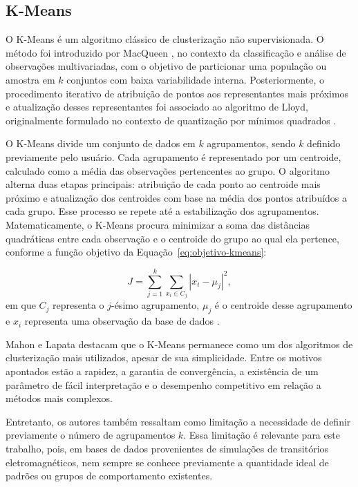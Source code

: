 \documentclass[
	12pt,				%
	openright,			%
	oneside,			%
	a4paper,			%
	chapter=TITLE,		%
	section=TITLE,		%
	subsection=TITLE,	%
	subsubsection=TITLE,%
	english,			%
	brazilian			%
	]{abntex2}
\theoremstyle{definition}
\begin{document}
\subsection{K-Means}

O K-Means é um algoritmo clássico de clusterização não supervisionada. O método foi introduzido por MacQueen \cite{macqueen1967}, no contexto da classificação e análise de observações multivariadas, com o objetivo de particionar uma população ou amostra em $k$ conjuntos com baixa variabilidade interna. Posteriormente, o procedimento iterativo de atribuição de pontos aos representantes mais próximos e atualização desses representantes foi associado ao algoritmo de Lloyd, originalmente formulado no contexto de quantização por mínimos quadrados \cite{lloyd1982}.

O K-Means divide um conjunto de dados em $k$ agrupamentos, sendo $k$ definido previamente pelo usuário. Cada agrupamento é representado por um centroide, calculado como a média das observações pertencentes ao grupo. O algoritmo alterna duas etapas principais: atribuição de cada ponto ao centroide mais próximo e atualização dos centroides com base na média dos pontos atribuídos a cada grupo. Esse processo se repete até a estabilização dos agrupamentos. Matematicamente, o K-Means procura minimizar a soma das distâncias quadráticas entre cada observação e o centroide do grupo ao qual ela pertence, conforme a função objetivo da Equação~\ref{eq:objetivo-kmeans}:

\begin{equation}
\label{eq:objetivo-kmeans}
J = \sum_{j=1}^{k} \sum_{x_i \in C_j} |x_i - \mu_j|^2,
\end{equation}
em que $C_j$ representa o $j$-ésimo agrupamento, $\mu_j$ é o centroide desse agrupamento e $x_i$ representa uma observação da base de dados \cite{bishop2006}.

Mahon e Lapata \cite{mahon2025} destacam que o K-Means permanece como um dos algoritmos de clusterização mais utilizados, apesar de sua simplicidade. Entre os motivos apontados estão a rapidez, a garantia de convergência, a existência de um parâmetro de fácil interpretação e o desempenho competitivo em relação a métodos mais complexos.

Entretanto, os autores também ressaltam como limitação a necessidade de definir previamente o número de agrupamentos $k$. Essa limitação é relevante para este trabalho, pois, em bases de dados provenientes de simulações de transitórios eletromagnéticos, nem sempre se conhece previamente a quantidade ideal de padrões ou grupos de comportamento existentes.
\end{document}
